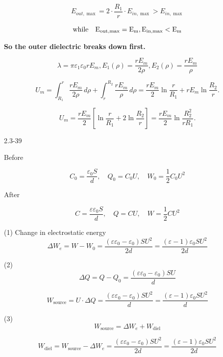 \documentclass{article}
\begin{document}
$$ E_{out,\max} = 2 \cdot \frac{R_1}{r} \cdot E_{in,\max} > E_{in,\max} $$

$$ \rm{while}\quad  E_{out,\max}=E_m, E_{in,\max}<E_m $$

\vspace{2em}

\textbf{So the outer dielectric breaks down first.}



$$\lambda = \pi\varepsilon_1\varepsilon_0 r E_m ,E_1(\rho) = \frac{r E_m}{2\rho}, E_2(\rho) = \frac{r E_m}{\rho}$$


$$U_m = \int_{R_1}^{r} \frac{r E_m}{2\rho} \, d\rho + \int_{r}^{R_2} \frac{r E_m}{\rho} \, d\rho= \frac{r E_m}{2} \ln\frac{r}{R_1} + r E_m \ln\frac{R_2}{r}.$$

\vspace{2em}

$$U_m = \frac{r E_m}{2} \left[ \ln\frac{r}{R_1} + 2\ln\frac{R_2}{r} \right]= \frac{r E_m}{2} \ln\frac{R_2^2}{r R_1}.$$






\newpage

2.3-39

Before 

$$C_0 = \frac{\varepsilon_0 S}{d}, \quad Q_0 = C_0 U, \quad W_0 = \frac{1}{2} C_0 U^2$$

After 

$$C = \frac{\varepsilon\varepsilon_0 S}{d}, \quad Q = C U, \quad W = \frac{1}{2} C U^2$$



(1) Change in electrostatic energy
$$\Delta W_e = W - W_0 = \frac{(\varepsilon\varepsilon_0 - \varepsilon_0)S U^2}{2d}=\frac{(\varepsilon-1)\varepsilon_0SU^2}{2d}$$




(2) 
$$\Delta Q = Q - Q_0 = \frac{(\varepsilon\varepsilon_0 - \varepsilon_0)S U}{d} $$

$$W_{\text{source}} = U \cdot \Delta Q = \frac{(\varepsilon\varepsilon_0 - \varepsilon_0)S U^2}{d}=\frac{(\varepsilon-1)\varepsilon_0SU^2}{d} $$




(3) 
$$W_{\text{source}} = \Delta W_e + W_{\text{diel}}$$

$$W_{\text{diel}} = W_{\text{source}} - \Delta W_e= \frac{(\varepsilon\varepsilon_0 - \varepsilon_0)S U^2}{2d}=\frac{(\varepsilon-1)\varepsilon_0SU^2}{2d} $$
\end{document}

